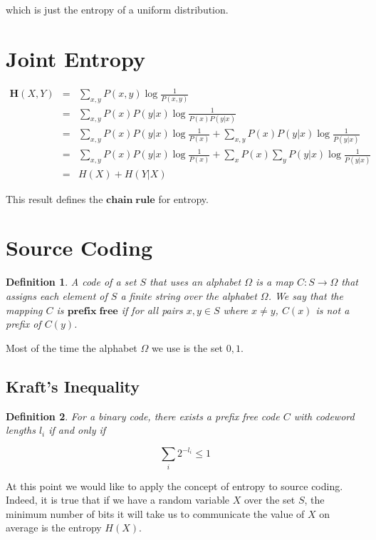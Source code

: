 \documentclass[a4paper,11pt]{book}
\newtheorem{definition}{Definition}
\begin{document}
which is just the entropy of a uniform distribution. 

\section{Joint Entropy}

\begin{eqnarray*}
\textbf{H}(X,Y) &=& \sum_{x,y} P(x,y)\log \frac{1}{P(x,y)} \\
&=& \sum_{x,y} P(x)P(y|x)\log \frac{1}{P(x)P(y|x)}\\
&=& \sum_{x,y}  P(x)P(y|x)\log \frac{1}{P(x)} + \sum_{x,y}  P(x)P(y|x)\log\frac{1}{P(y|x)} \\
&=& \sum_{x,y}  P(x)P(y|x)\log \frac{1}{P(x)} + \sum_{x}  P(x)\sum_{y}P(y|x)\log\frac{1}{P(y|x)} \\
&=& H(X) + H(Y|X)
\end{eqnarray*}

This result defines the $\mathbf{chain \; rule}$ for entropy.

\section{Source Coding}

\begin{definition}
A code of a set $S$ that uses an alphabet $\Omega$ is a map $C: S\rightarrow \Omega$ that assigns each element of $S$ a finite string over the alphabet $\Omega$. We say that the mapping $C$ is $\mathbf{prefix \; free}$ if for all pairs $x,y \in S$ where $x \neq y$, $C(x)$ is not a prefix of $C(y)$.
\end{definition}

Most of the time the alphabet $\Omega$ we use is the set $0,1$.

\subsection{Kraft's Inequality}

\begin{definition}
For a binary code, there exists a prefix free code $C$ with codeword lengths $l_{i}$ if and only if
\end{definition}

\begin{equation}
\sum_{i} 2^{-l_{i}} \leq 1
\end{equation}

At this point we would like to apply the concept of entropy to source coding. Indeed, it is true that if we have a random variable $X$ over the set $S$, the minimum number of bits it will take us to communicate the value of $X$ on average is the entropy $H(X)$.
\end{document}
